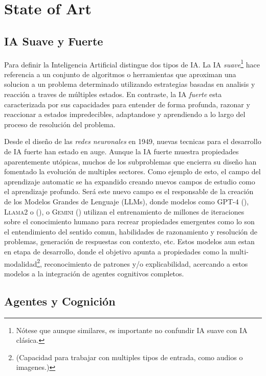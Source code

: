 \chapter{State of Art}
\section{IA Suave y Fuerte}

Para definir la Inteligencia Artificial \citet{searle1980minds} distingue dos
tipos de IA. La IA \emph{suave}\footnote{Nótese que aunque similares, es
importante no confundir IA suave con IA clásica.} hace referencia a un conjunto
de algoritmos o herramientas que aproximan una solucion a un problema
determinado utilizando estrategias basadas en analisis y reacción a traves de
múltiples estados. En contraste, la IA \emph{fuerte} esta caracterizada por
sus capacidades para entender de forma profunda, razonar y reaccionar a estados
impredecibles, adaptandose y aprendiendo a lo largo del proceso de resolución
del problema. 

Desde el diseño de las \emph{redes neuronales} en 1949, nuevas tecnicas para el 
desarrollo de IA fuerte han estado en auge. Aunque la IA fuerte muestra
propiedades aparentemente utópicas, muchos de los subproblemas que encierra su
diseño han fomentado la evolución de multiples sectores. Como ejemplo de esto,
el campo del aprendizaje automatic se ha expandido creando nuevos campos de
estudio como el aprendizaje profundo. Será este nuevo campo es el responsable de
la creación de los Modelos Grandes de Lenguaje (LLMs), donde modelos como
\textsc{GPT-4} (\citet{achiam2023gpt}), \textsc{Llama2} o
(\citet{touvron2023llama}), o \textsc{Gemini} (\citet{saeidnia2023welcome}) utilizan
el entrenamiento de millones de iteraciones sobre el conocimiento humano para recrear
propiedades emergentes como lo son el entendimiento del sentido comun, habilidades
de razonamiento y resolución de problemas, generación de respuestas con contexto, etc.
Estos modelos aun estan en etapa de desarrollo, donde el objetivo apunta a
propiedades como la multi-modalidad\footnote{(Capacidad para trabajar con
multiples tipos de entrada, como audios o imagenes.)}, reconocimiento de
patrones y/o explicabilidad, acercando a estos modelos a la integración de agentes
cognitivos completos.


\section{Agentes y Cognición}
\label{sec:agents_and_cognition}

